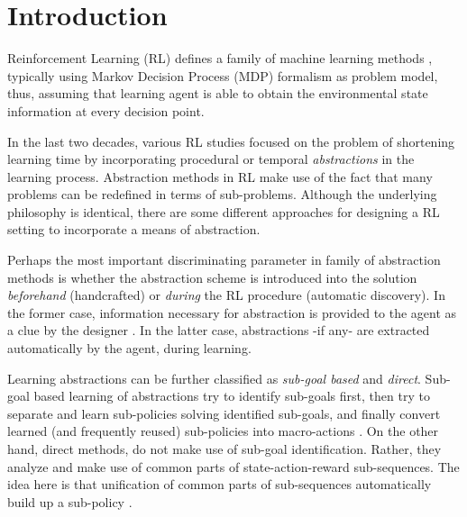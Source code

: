 \documentclass[10pt, conference, compsocconf]{IEEEtran}
\begin{document}
%
\IEEEpeerreviewmaketitle



\section{Introduction}
Reinforcement Learning (RL) defines a family of machine learning methods  \cite{sutton_reinforcement_1998}, typically using Markov Decision Process (MDP) formalism as problem model, thus, assuming that learning agent is able to obtain the environmental state information at every decision point.

In the last two decades, various RL studies focused on the problem of shortening learning time by incorporating procedural or temporal \textit{abstractions} in the learning process. Abstraction methods in RL make use of the fact that many problems can be redefined in terms of sub-problems. Although the underlying philosophy is identical, there are some different approaches for designing a RL setting to incorporate a means of abstraction.

Perhaps the most important discriminating parameter in family of abstraction methods is whether the abstraction scheme is introduced into the solution \textit{beforehand} (handcrafted) or \textit{during}  the RL procedure (automatic discovery). In the former case, information necessary for abstraction is provided to the agent as a clue by the designer \cite{sutton_between_1999, dietterich_hierarchical_2000}. In the latter case,  abstractions -if any- are extracted automatically by the agent, during learning.

Learning abstractions can be further classified as \textit{sub-goal based} and \textit{direct}. Sub-goal based learning of abstractions try to identify sub-goals first, then try to separate and learn sub-policies solving identified sub-goals, and finally convert learned (and frequently reused) sub-policies into macro-actions \cite{hengst_discovering_2002, mcgovern_automatic_2001, menache_q-cut_2002}. On the other hand, direct methods, do not make use of sub-goal identification. Rather, they analyze and make use of common parts of state-action-reward sub-sequences. The idea here is that unification of common parts of sub-sequences automatically build up a sub-policy \cite{mcgovern_acquire-macros:_1998,girgin_improving_2010}.
\end{document}
